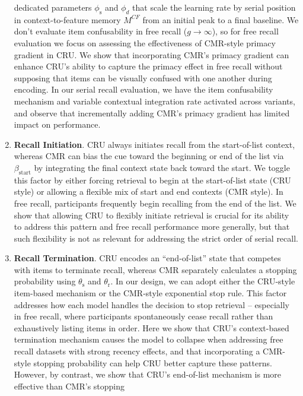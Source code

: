 \documentclass[
  man,
  floatsintext,
  longtable,
  nolmodern,
  notxfonts,
  notimes,
  draftfirst,
  colorlinks=true,linkcolor=blue,citecolor=blue,urlcolor=blue]{apa7}
\begin{document}
\begin{enumerate}
  dedicated parameters \(\phi_\text{s}\) and \(\phi_{d}\) that scale the
  learning rate by serial position in context-to-feature memory
  \(M^{CF}\) from an initial peak to a final baseline. We don't evaluate
  item confusability in free recall (\(g \rightarrow \infty\)), so for
  free recall evaluation we focus on assessing the effectiveness of
  CMR-style primacy gradient in CRU. We show that incorporating CMR's
  primacy gradient can enhance CRU's ability to capture the primacy
  effect in free recall without supposing that items can be visually
  confused with one another during encoding. In our serial recall
  evaluation, we have the item confusability mechanism and variable
  contextual integration rate activated across variants, and observe
  that incrementally adding CMR's primacy gradient has limited impact on
  performance.
\item
  \textbf{Recall Initiation}. CRU always initiates recall from the
  start-of-list context, whereas CMR can bias the cue toward the
  beginning or end of the list via \(\beta_\text{start}\) by integrating
  the final context state back toward the start. We toggle this factor
  by either forcing retrieval to begin at the start-of-list state (CRU
  style) or allowing a flexible mix of start and end contexts (CMR
  style). In free recall, participants frequently begin recalling from
  the end of the list. We show that allowing CRU to flexibly initiate
  retrieval is crucial for its ability to address this pattern and free
  recall performance more generally, but that such flexibility is not as
  relevant for addressing the strict order of serial recall.
\item
  \textbf{Recall Termination}. CRU encodes an ``end-of-list'' state that
  competes with items to terminate recall, whereas CMR separately
  calculates a stopping probability using \(\theta_\text{s}\) and
  \(\theta_\text{r}\). In our design, we can adopt either the CRU-style
  item-based mechanism or the CMR-style exponential stop rule. This
  factor addresses how each model handles the decision to stop retrieval
  -- especially in free recall, where participants spontaneously cease
  recall rather than exhaustively listing items in order. Here we show
  that CRU's context-based termination mechanism causes the model to
  collapse when addressing free recall datasets with strong recency
  effects, and that incorporating a CMR-style stopping probability can
  help CRU better capture these patterns. However, by contrast, we show
  that CRU's end-of-list mechanism is more effective than CMR's stopping

\end{enumerate}
\end{document}
